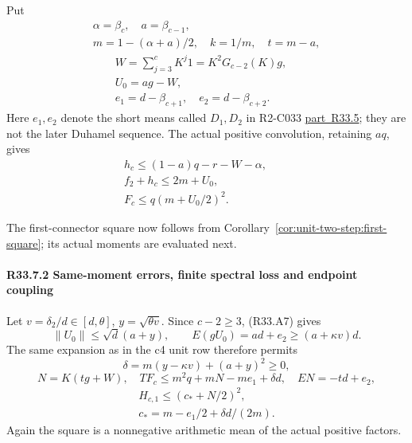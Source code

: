 Put
\[
\begin{gathered}
\alpha=\beta_c,\quad a=\beta_{c-1},\quad\\
m=1-(\alpha+a)/2,\quad k=1/m,\quad t=m-a,
\end{gathered}
\]
\[
\begin{gathered}
W=\sum_{j=3}^cK^j1=K^2G_{c-2}(K)g,\quad\\
U_0=ag-W,\quad\\
e_1=d-\beta_{c+1},\quad e_2=d-\beta_{c+2}.
\end{gathered}
\]
Here \(e_1,\allowbreak \allowbreak  e_2\) denote the short means called \(D_1,\allowbreak \allowbreak  D_2\) in
R2-C033 \mbox{\hyperref[part:R33.5]{part R33.5}}; they are not the later Duhamel sequence.
The actual positive convolution, retaining \(aq\), gives
\[
\begin{gathered}
h_c\le(1-a)q-r-W-\alpha,\qquad\\
f_2+h_c\le2m+U_0,\qquad\\
F_c\le q(m+U_0/2)^2.
\end{gathered}\tag{R33.A40}
\]

The first-connector square now follows from
Corollary~\ref{cor:unit-two-step:first-square}; its actual moments
are evaluated next.

\paragraph{R33.7.2 Same-moment errors, finite spectral loss and endpoint coupling}\label{part:R33.7.2}

Let \(v=\delta_2/d\in[d,\allowbreak \allowbreak  \theta]\), \(y=\sqrt{\theta v}\).
Since \(c-2\ge3\), (R33.A7) gives
\[
\|U_0\|\le\sqrt d(a+y),\qquad
E(gU_0)=ad+e_2\ge(a+\kappa v)d.
\]
The same expansion as in the c4 unit row therefore permits
\[
\delta=m(y-\kappa v)+(a+y)^2\ge0,
\]
\[
N=K(tg+W),\quad TF_c\le m^2q+mN-me_1+\delta d,\quad EN=-td+e_2,
\]
\[
\begin{gathered}
H_{c,1}\le(c_*+N/2)^2,\quad\\
c_*=m-e_1/2+\delta d/(2m).
\end{gathered}\tag{R33.A42}
\]
Again the square is a nonnegative arithmetic mean of the actual
positive factors.

